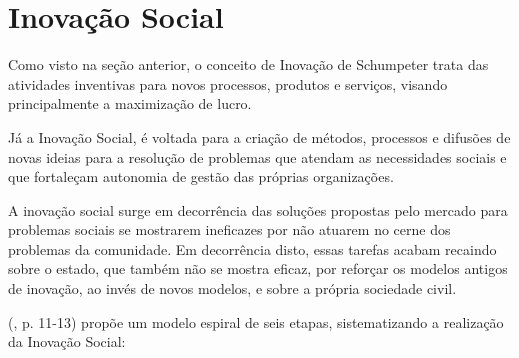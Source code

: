 \section {Inovação Social}
\label{inovacaosocial}

Como visto na seção anterior, o conceito de Inovação de Schumpeter trata das atividades inventivas para novos processos, produtos e serviços, visando principalmente a maximização de lucro. 

Já a Inovação Social, é voltada para a criação de métodos, processos e difusões de novas ideias para a resolução de problemas que atendam as necessidades sociais e que fortaleçam autonomia de gestão das próprias organizações. \cite{monteiro2019}

A inovação social surge em decorrência das soluções propostas pelo mercado para problemas sociais se mostrarem ineficazes por não atuarem no cerne dos problemas da comunidade. Em decorrência disto, essas tarefas acabam recaindo sobre o estado, que também não se mostra eficaz, por reforçar os modelos antigos de inovação, ao invés de novos modelos, e sobre a própria sociedade civil. \cite{murray2010}

\citeauthor{murray2010} (\citeyear{murray2010}, p. 11-13) propõe um modelo espiral de seis etapas, sistematizando a realização da Inovação Social:



